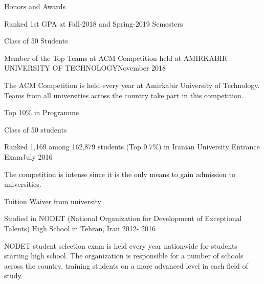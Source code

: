 \documentclass{resume} %
\begin{document}
\begin{rSection}{Honors and Awards}
	
	\begin{rSubsection}{Ranked 1st GPA at Fall-2018 and Spring-2019 Semesters }{ }{ }{ }
		\item Class of 50 Students
	\end{rSubsection}	

	\begin{rSubsection}{Member of the Top Teams at ACM Competition held at AMIRKABIR UNIVERSITY OF TECHNOLOGY}{November 2018}{ }{ }
		\item The ACM Competition is held every year at Amirkabir University of Technology. Teams from all universities across the country take part in this competition.
	\end{rSubsection}
	
	\begin{rSubsection}{Top 10\% in Programme}{ }{ }{ }
			\item Class of 50 students
	\end{rSubsection}

	\begin{rSubsection}{Ranked 1,169 among 162,879 students (Top 0.7\%) in Iranian University Entrance Exam}{July 2016}{ }{ }
		\item The competition is intense since it is the only means to gain admission to universities.
		\item Tuition Waiver from university
	\end{rSubsection} 

	\begin{rSubsection}{Studied in NODET (National Organization for Development of Exceptional Talents) High School in Tehran, Iran }{2012- 2016}{ }{ }
		\item NODET student selection exam is held every year nationwide for students starting high school. The organization is responsible for a number of schools across the country, training students on a more advanced level in each field of study.
	\end{rSubsection}
	
\end{rSection}
\end{document}
